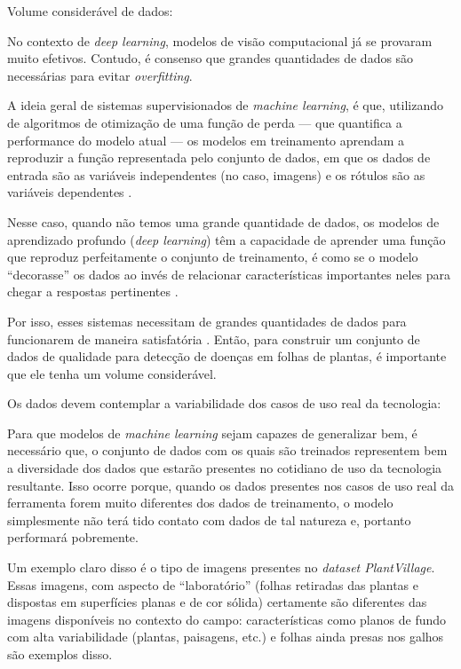 \begin{enumerate}
{\bf \item  Volume considerável de dados:}

No contexto de \emph{deep learning}, modelos de visão computacional já se provaram muito efetivos. Contudo, é consenso que grandes quantidades de dados são necessárias para evitar \emph{overfitting}.

A ideia geral de sistemas supervisionados de \emph{machine learning}, é que, utilizando de algoritmos de otimização de uma função de perda --- que quantifica a performance do modelo atual --- os modelos em treinamento aprendam a reproduzir a função representada pelo conjunto de dados, em que os dados de entrada são as variáveis independentes (no caso, imagens) e os rótulos são as variáveis dependentes \citep{Yaser:2012}. 

Nesse caso, quando não temos uma grande quantidade de dados, os modelos de aprendizado profundo (\emph{deep learning}) têm a capacidade de aprender uma função que reproduz perfeitamente o conjunto de treinamento, é como se o modelo ``decorasse'' os dados ao invés de relacionar características importantes neles para chegar a respostas pertinentes \citep{Yaser:2012, Shorten2019A}. 

Por isso, esses sistemas necessitam de grandes quantidades de dados para funcionarem de maneira satisfatória \citep{Shorten2019A}. Então, para construir um conjunto de dados de qualidade para detecção de doenças em folhas de plantas, é importante que ele tenha um volume considerável.

{\bf \item Os dados devem contemplar a variabilidade dos casos de uso real da tecnologia:}
Para que modelos de \emph{machine learning} sejam capazes de generalizar bem, é necessário que, o conjunto de dados com os quais são treinados representem bem a diversidade dos dados que estarão presentes no cotidiano de uso da tecnologia resultante. Isso ocorre porque, quando os dados presentes nos casos de uso real da ferramenta forem muito diferentes dos dados de treinamento, o modelo simplesmente não terá tido contato com dados de tal natureza e, portanto performará pobremente. 

Um exemplo claro disso é o tipo de imagens presentes no \emph{dataset PlantVillage}. Essas imagens, com aspecto de ``laboratório'' (folhas retiradas das plantas e dispostas em superfícies planas e de cor sólida) certamente são diferentes das imagens disponíveis no contexto do campo: características como planos de fundo com alta variabilidade (plantas, paisagens, etc.) e folhas ainda presas nos galhos são exemplos disso.


\end{enumerate}
